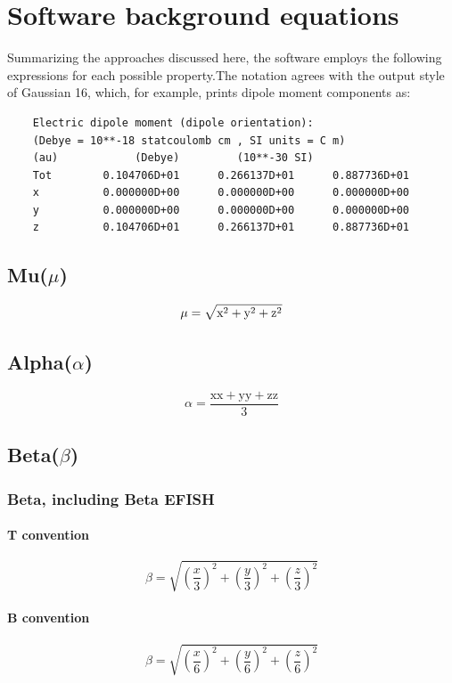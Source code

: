 \documentclass{article}
\begin{document}
	\section{Software background equations}
	Summarizing the approaches discussed here, the software employs the following expressions for each possible property.The notation agrees with the output style of Gaussian 16, which, for example, prints dipole moment components as:
	\begin{verbatim}
	Electric dipole moment (dipole orientation):
	(Debye = 10**-18 statcoulomb cm , SI units = C m)
	(au)            (Debye)         (10**-30 SI)
	Tot        0.104706D+01      0.266137D+01      0.887736D+01
	x          0.000000D+00      0.000000D+00      0.000000D+00
	y          0.000000D+00      0.000000D+00      0.000000D+00
	z          0.104706D+01      0.266137D+01      0.887736D+01
	\end{verbatim}
	\subsection{Mu($\mu$)}
	\begin{equation}\label{eq:DipoleMoment_soft}
	\mu = \sqrt{{\text x}^2+{\text y}^2+{\text z}^2}
	\end{equation}
	\subsection{Alpha($\alpha$)}
	\begin{equation}\label{eq:alpha_soft}
	\alpha = \frac{{\text{xx}} + {\text{yy}} + {\text{zz}}}{3} 
	\end{equation}
	\subsection{Beta($\beta$)}
	\subsubsection{Beta, including Beta EFISH}
	\paragraph{T convention}
	\begin{equation}\label{eq:beta_T}
	\beta = \sqrt{\left(\frac{x}{3}\right)^2 + \left(\frac{y}{3}\right)^2 + \left(\frac{z}{3}\right)^2} 
	\end{equation}
	\paragraph{B convention}
	\begin{equation}\label{eq:beta_B}
	\beta = \sqrt{\left(\frac{x}{6}\right)^2 + \left(\frac{y}{6}\right)^2 + \left(\frac{z}{6}\right)^2} 
	\end{equation}
\end{document}
